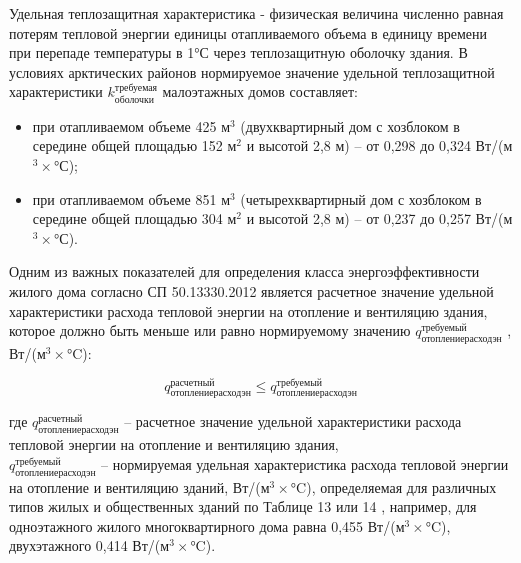 Удельная теплозащитная характеристика - физическая величина численно равная потерям тепловой энергии единицы отапливаемого объема
в единицу времени при перепаде температуры в 1°С через теплозащитную оболочку здания.
В условиях арктических районов нормируемое значение удельной теплозащитной характеристики $k_\text{оболочки}^\text{требуемая}$  малоэтажных домов составляет:
\begin{itemize}
    \item при отапливаемом объеме 425 м$^3$ (двухквартирный дом с хозблоком в середине общей площадью 152 м$^2$ и высотой 2,8 м) – от 0,298 до 0,324 Вт/(м$^3 \times$°С);
    \item при отапливаемом объеме 851 м$^3$ (четырехквартирный дом с хозблоком в середине общей площадью 304 м$^2$ и высотой 2,8 м) – от 0,237 до 0,257 Вт/(м$^3 \times$°С).
\end{itemize}

Одним из важных показателей для определения класса энергоэффективности жилого дома согласно  СП 50.13330.2012 \cite{law_RU_Rules_Code_ThermalPerformance}
является расчетное значение удельной характеристики расхода тепловой энергии на отопление и вентиляцию здания, которое должно быть меньше или равно нормируемому
значению $q_\text{отоплениерасходэн}^\text{требуемый}$  , Вт/(м$^3 \times$°C):

\begin{eqndesc}
    \begin{equation}\label{eq:heatconsumectequal}
        q_\text{отоплениерасходэн}^\text{расчетный}   \leqslant   q_\text{отоплениерасходэн}^\text{требуемый}
    \end{equation}

    где $q_\text{отоплениерасходэн}^\text{расчетный}$ -- расчетное значение удельной характеристики расхода тепловой энергии на отопление и вентиляцию здания, \\
    $q_\text{отоплениерасходэн}^\text{требуемый}$ -- нормируемая удельная характеристика расхода тепловой энергии на отопление и вентиляцию зданий, Вт/(м$^3 \times$°C),
    определяемая для различных типов жилых и общественных зданий по Таблице 13 или 14 \cite{law_RU_Rules_Code_ThermalPerformance},
    например, для одноэтажного жилого многоквартирного дома равна 0,455 Вт/(м$^3 \times$°C), двухэтажного 0,414 Вт/(м$^3 \times$°C).
\end{eqndesc}
